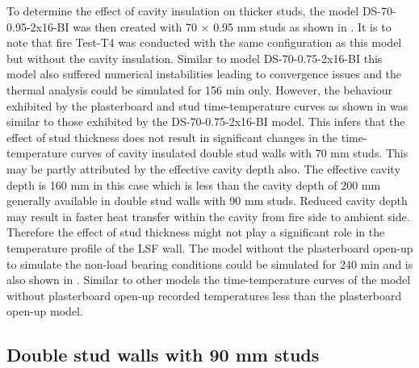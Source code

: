 To determine the effect of cavity insulation on thicker studs, the model DS-70-0.95-2x16-BI was then created with 70 $\times$ 0.95 mm studs as shown in . It is to note that fire Test-T4 was conducted with the same configuration as this model but without the cavity insulation. 
Similar to model DS-70-0.75-2x16-BI this model also suffered numerical instabilities leading to convergence issues and the thermal analysis could be simulated for 156 min only. However, the behaviour exhibited by the plasterboard and stud time-temperature curves as shown in  was similar to those exhibited by the DS-70-0.75-2x16-BI model. This infers that the effect of stud thickness does not result in significant changes in the time-temperature curves of cavity insulated double stud walls with 70 mm studs. This may be partly attributed by the effective cavity depth also. The effective cavity depth is 160 mm in this case which is less than the cavity depth of 200 mm generally available in double stud walls with 90 mm studs. Reduced cavity depth may result in faster heat transfer within the cavity from fire side to ambient side. Therefore the effect of stud thickness might not play a significant role in the temperature profile of the LSF wall. The model without the plasterboard open-up to simulate the non-load bearing conditions could be simulated for 240 min and is also shown in . Similar to other models the time-temperature curves of the model without plasterboard open-up recorded temperatures less than the plasterboard open-up model.

\subsection{Double stud walls with 90 mm studs}

